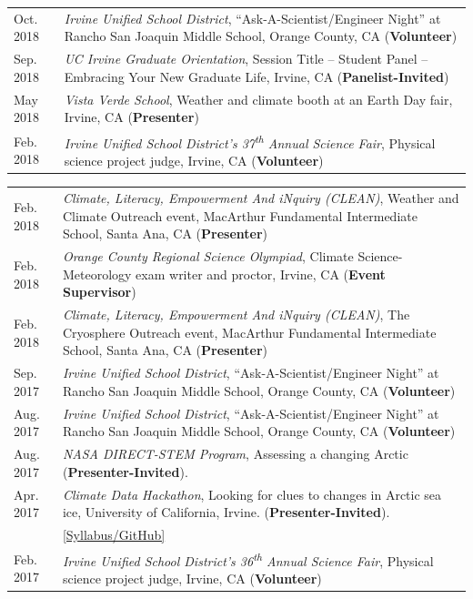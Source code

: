 \documentclass[margin,line,palatino,courier,10pt]{res}
\begin{document}
\begin{resume}
\begin{tabular}{@{}p{0.9in}p{4in}}
Oct. 2018 & \textit{Irvine Unified School District}, ``Ask-A-Scientist/Engineer Night'' at Rancho San Joaquin Middle School, Orange County, CA (\textbf{Volunteer})\\
Sep. 2018 & \textit{UC Irvine Graduate Orientation}, Session Title -- Student Panel -- Embracing Your New Graduate Life, Irvine, CA (\textbf{Panelist-Invited})\\
May 2018 & \textit{Vista Verde School}, Weather and climate booth at an Earth Day fair, Irvine, CA (\textbf{Presenter})\\
Feb. 2018 & \textit{Irvine Unified School District's 37\textsuperscript{th} Annual Science Fair}, Physical science project judge, Irvine, CA (\textbf{Volunteer})\\
\end{tabular}
\begin{tabular}{@{}p{0.9in}p{4in}}
Feb. 2018 & \textit{Climate, Literacy, Empowerment And iNquiry (CLEAN)}, Weather and Climate Outreach event, MacArthur Fundamental Intermediate School, Santa Ana, CA (\textbf{Presenter})\\
Feb. 2018 & \textit{Orange County Regional Science Olympiad}, Climate Science-Meteorology exam writer and proctor, Irvine, CA (\textbf{Event Supervisor})\\
Feb. 2018 & \textit{Climate, Literacy, Empowerment And iNquiry (CLEAN)}, The Cryosphere Outreach event, MacArthur Fundamental Intermediate School, Santa Ana, CA (\textbf{Presenter})\\
Sep. 2017 & \textit{Irvine Unified School District}, ``Ask-A-Scientist/Engineer Night'' at Rancho San Joaquin Middle School, Orange County, CA (\textbf{Volunteer})\\
Aug. 2017 & \textit{Irvine Unified School District}, ``Ask-A-Scientist/Engineer Night'' at Rancho San Joaquin Middle School, Orange County, CA (\textbf{Volunteer})\\
Aug. 2017 & \textit{NASA DIRECT-STEM Program}, Assessing a changing Arctic (\textbf{Presenter-Invited}).\\
Apr. 2017 & \textit{Climate Data Hackathon}, Looking for clues to changes in Arctic 
sea ice, University of California, Irvine. (\textbf{Presenter-Invited}).\\ & \href{https://github.com/UCIDataScienceInitiative/Climate_Hackathon}{[Syllabus/GitHub]}\\
Feb. 2017 & \textit{Irvine Unified School District's 36\textsuperscript{th} Annual Science Fair}, Physical science project judge, Irvine, CA (\textbf{Volunteer})\\

\end{tabular}
\end{resume}
\end{document}
